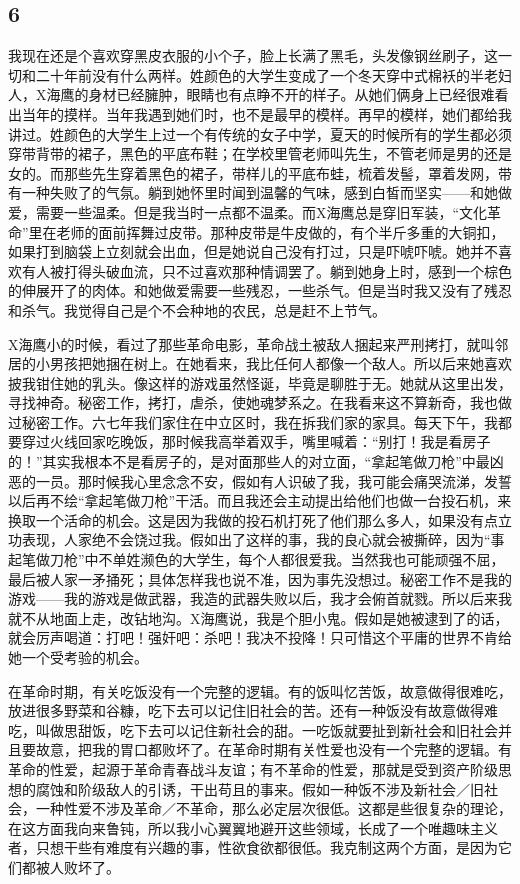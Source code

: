 \subsection{6} 

我现在还是个喜欢穿黑皮衣服的小个子，脸上长满了黑毛，头发像钢丝刷子，这一切和二十年前没有什么两样。姓颜色的大学生变成了一个冬天穿中式棉袄的半老妇人，X海鹰的身材已经臃肿，眼睛也有点睁不开的样子。从她们俩身上已经很难看出当年的摸样。当年我遇到她们时，也不是最早的模样。再早的模样，她们都给我讲过。姓颜色的大学生上过一个有传统的女子中学，夏天的时候所有的学生都必须穿带背带的裙子，黑色的平底布鞋；在学校里管老师叫先生，不管老师是男的还是女的。而那些先生穿着黑色的裙子，带样儿的平底布蛙，梳着发髻，罩着发网，带有一种失败了的气氛。躺到她怀里时闻到温馨的气味，感到白皙而坚实——和她做爱，需要一些温柔。但是我当时一点都不温柔。而X海鹰总是穿旧军装，“文化革命”里在老师的面前挥舞过皮带。那种皮带是牛皮做的，有个半斤多重的大铜扣，如果打到脑袋上立刻就会出血，但是她说自己没有打过，只是吓唬吓唬。她并不喜欢有人被打得头破血流，只不过喜欢那种情调罢了。躺到她身上时，感到一个棕色的伸展开了的肉体。和她做爱需要一些残忍，一些杀气。但是当时我又没有了残忍和杀气。我觉得自己是个不会种地的农民，总是赶不上节气。 

X海鹰小的时候，看过了那些革命电影，革命战土被敌人捆起来严刑拷打，就叫邻居的小男孩把她捆在树上。在她看来，我比任何人都像一个敌人。所以后来她喜欢披我钳住她的乳头。像这样的游戏虽然怪诞，毕竟是聊胜于无。她就从这里出发，寻找神奇。秘密工作，拷打，虐杀，使她魂梦系之。在我看来这不算新奇，我也做过秘密工作。六七年我们家住在中立区时，我在拆我们家的家具。每天下午，我都要穿过火线回家吃晚饭，那时候我高举着双手，嘴里喊着：“别打！我是看房子的！”其实我根本不是看房子的，是对面那些人的对立面，“拿起笔做刀枪”中最凶恶的一员。那时候我心里念念不安，假如有人识破了我，我可能会痛哭流涕，发誓以后再不绘“拿起笔做刀枪”干活。而且我还会主动提出给他们也做一台投石机，来换取一个活命的机会。这是因为我做的投石机打死了他们那么多人，如果没有点立功表现，人家绝不会饶过我。假如出了这样的事，我的良心就会被撕碎，因为“事起笔做刀枪”中不单姓濒色的大学生，每个人都很爱我。当然我也可能顽强不屈，最后被人家一矛捅死；具体怎样我也说不准，因为事先没想过。秘密工作不是我的游戏——我的游戏是做武器，我造的武器失败以后，我才会俯首就戮。所以后来我就不从地面上走，改钻地沟。X海鹰说，我是个胆小鬼。假如是她被逮到了的话，就会厉声喝道：打吧！强奸吧：杀吧！我决不投降！只可惜这个平庸的世界不肯给她一个受考验的机会。 

在革命时期，有关吃饭没有一个完整的逻辑。有的饭叫忆苦饭，故意做得很难吃，放进很多野菜和谷糠，吃下去可以记住旧社会的苦。还有一种饭没有故意做得难吃，叫做思甜饭，吃下去可以记住新社会的甜。一吃饭就要扯到新社会和旧社会并且要故意，把我的胃口都败坏了。在革命时期有关性爱也没有一个完整的逻辑。有革命的性爱，起源于革命青春战斗友谊；有不革命的性爱，那就是受到资产阶级思想的腐蚀和阶级敌人的引诱，干出苟且的事来。假如一种饭不涉及新社会／旧社会，一种性爱不涉及革命／不革命，那么必定层次很低。这都是些很复杂的理论，在这方面我向来鲁钝，所以我小心翼翼地避开这些领域，长成了一个唯趣味主义者，只想干些有难度有兴趣的事，性欲食欲都很低。我克制这两个方面，是因为它们都被人败坏了。 

